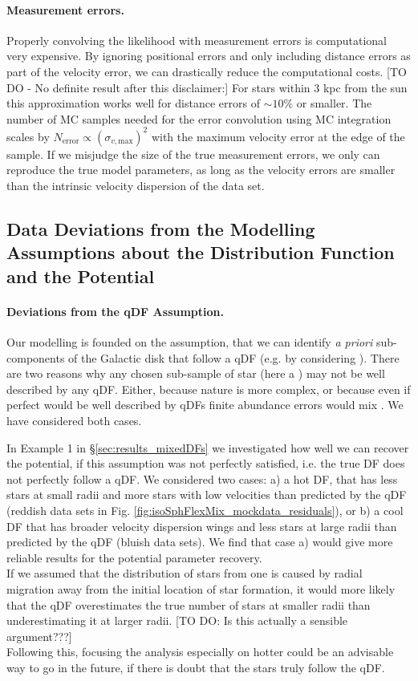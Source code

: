 \paragraph{Measurement errors.} Properly convolving the likelihood with measurement errors is computational very expensive. By ignoring positional errors and only including distance errors as part of the velocity error, we can drastically reduce the computational costs. [TO DO - No definite result after this disclaimer:] For stars within 3 kpc from the sun this approximation works well for distance errors of $\sim 10\%$ or smaller. The number of MC samples needed for the error convolution using MC integration scales by $N_\text{error} \propto (\sigma_{v,\text{max}})^2$ with the maximum velocity error at the edge of the sample. If we misjudge the size of the true measurement errors, we only can reproduce the true model parameters, as long as the velocity errors are smaller than the intrinsic velocity dispersion of the data set.

\subsection{Data Deviations from the Modelling Assumptions about the Distribution Function and the Potential}

\paragraph{Deviations from the qDF Assumption.}  Our modelling is founded on the assumption, that we can identify {\sl a priori} sub-components of the Galactic disk that follow a qDF (e.g. by considering \MAPs ). There are two reasons why any chosen sub-sample of star (here a \MAP ) may not be well described by any qDF. Either, because nature is more complex, or because even if perfect
\MAPs would be well described by qDFs finite abundance errors would mix \MAPs .  We have considered both cases.

 In Example 1 in \S\ref{sec:results_mixedDFs} we investigated how well we can recover the potential, if this assumption was not perfectly satisfied, i.e. the \MAPs true DF does not perfectly follow a qDF. We considered two cases: a) a hot DF, that has less stars at small radii and more stars with low velocities than predicted by the qDF (reddish data sets in Fig. \ref{fig:isoSphFlexMix_mockdata_residuals}), or b) a cool DF that has broader velocity dispersion wings and less stars at large radii than predicted by the qDF (bluish data sets). We find that case a) would give more reliable results for the potential parameter recovery.
\\If we assumed that the distribution of stars from one \MAP is caused by radial migration away from the initial location of star formation, it would more likely that the qDF overestimates the true number of stars at smaller radii than underestimating it at larger radii. [TO DO: Is this actually a sensible argument???]
\\Following this, focusing the analysis especially on hotter \MAPs could be an advisable way to go in the future, if there is doubt that the stars truly follow the qDF.


